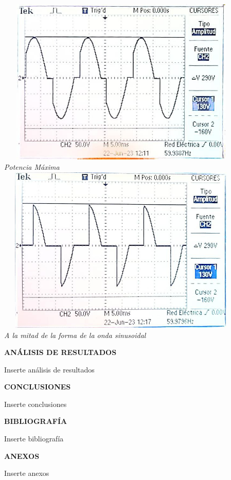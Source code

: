 \documentclass[12pt]{article}
\begin{document}
	\begin{center}
		\includegraphics[width=12cm,height=8cm]{Img/resul_24_1}\\
		\textit{Potencia Máxima}\\
		\vspace{2cm}
		\includegraphics[width=12cm,height=8cm]{Img/resul_24_2}\\
		\textit{A la mitad de la forma de la onda sinusoidal}\\
	\end{center}
	
	\newpage
	
	\begin{center}
		\textbf{\large ANÁLISIS DE RESULTADOS}\\
	\end{center}
	
	Inserte análisis de resultados
	
	\newpage
	
	\begin{center}
		\textbf{\large CONCLUSIONES}\\
	\end{center}
	
	Inserte conclusiones
	
	\newpage
	
	\begin{center}
		\textbf{\large BIBLIOGRAFÍA}\\
	\end{center}
	
	Inserte bibliografía
	
	\newpage
	
	\begin{center}
		\textbf{\large ANEXOS}\\
	\end{center}
	
	Inserte anexos
	
\end{document}

